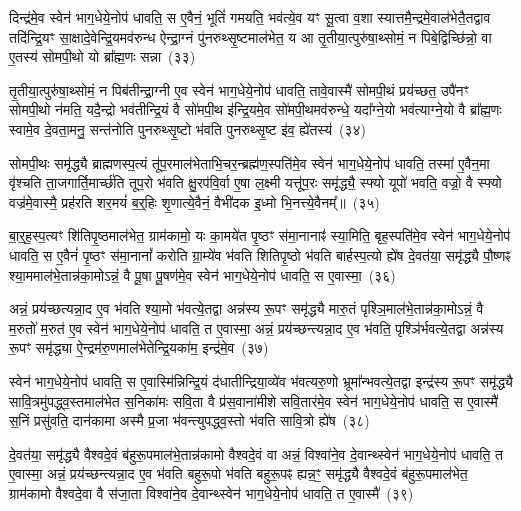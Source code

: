 दिन्द्र॑मे॒व स्वेन॑ भाग॒धेये॒नोप॑ धावति॒ स ए॒वैनं॒ भूतिं॑ गमयति॒ भव॑त्ये॒व यꣳ सू॒त्वा व॒शा स्यात्तमै॒न्द्रमे॒वाल॑भेतै॒तद्वाव तदि॑न्द्रि॒यꣳ सा॒क्षादे॒वेन्द्रि॒यमव॑रुन्ध ऐन्द्रा॒ग्नं पु॑नरुथ्सृ॒ष्टमा\-ल॑भेत॒ य आ तृ॒तीया॒त्पुरु॑षा॒थ्सोमं॒ न पिबे॒द्विच्छि॑न्नो॒ वा ए॒तस्य॑ सोमपी॒थो यो ब्रा᳚ह्म॒णः सन्ना~(३३)\ip

तृ॒तीया॒त्पुरु॑षा॒थ्सोमं॒ न पिब॑तीन्द्रा॒ग्नी ए॒व स्वेन॑ भाग॒धेये॒नोप॑ धावति॒ तावे॒वास्मै॑ सोमपी॒थं प्रय॑च्छत॒ उपै॑नꣳ सोमपी॒थो न॑मति॒ यदै॒न्द्रो भव॑तीन्द्रि॒यं वै सो॑मपी॒थ इ॑न्द्रि॒यमे॒व सो॑मपी॒थमव॑\-रुन्धे॒ यदा᳚ग्ने॒यो भव॑त्याग्ने॒यो वै ब्रा᳚ह्म॒णः स्वामे॒व दे॒वता॒मनु॒ सन्त॑नोति पुनरुथ्सृ॒ष्टो भ॑वति पुनरुथ्सृ॒ष्ट इ॑व॒ ह्ये॑तस्य॑~(३४)\ip

सोमपी॒थः समृ॑द्ध्यै ब्राह्मणस्प॒त्यं तू॑प॒रमाल॑भेताभि॒\-चर॒न्ब्रह्म॑ण॒स्पति॑मे॒व स्वेन॑ भाग॒धेये॒नोप॑ धावति॒ तस्मा॑ ए॒वैन॒मा वृ॑श्चति ता॒जगार्ति॒मार्च्छ॑ति तूप॒रो भ॑वति क्षु॒रप॑वि॒र्वा ए॒षा ल॒क्ष्मी यत्तू॑प॒रः समृ॑द्ध्यै॒ स्फ्यो यूपो॑ भवति॒ वज्रो॒ वै स्फ्यो वज्र॑मे॒वास्मै॒ प्रह॑रति शर॒मयं॑ ब॒र्॒\mbox{}हिः शृ॒णात्ये॒वैनं॒ वैभी॑दक इ॒ध्मो भि॒नत्त्ये॒वैनम्᳚॥~(३५)\ip

{}%

बा॒र्॒\mbox{}ह॒स्प॒त्यꣳ शि॑तिपृ॒ष्ठमा\-ल॑भेत॒ ग्राम॑कामो॒ यः का॒मये॑त पृ॒ष्ठꣳ स॑मा॒नानाꣴ॑ स्या॒मिति॒ बृह॒स्पति॑मे॒व स्वेन॑ भाग॒धेये॒नोप॑ धावति॒ स ए॒वैनं॑ पृ॒ष्ठꣳ स॑मा॒नानां᳚ करोति ग्रा॒म्ये॑व भ॑वति शितिपृ॒ष्ठो भ॑वति बार्\mbox{}हस्प॒त्यो ह्ये॑ष दे॒वत॑या॒ समृ॑द्ध्यै पौ॒ष्णꣴ श्या॒ममाल॑भे॒तान्न॑का॒मो\-ऽन्नं॒ वै पू॒षा पू॒षण॑मे॒व स्वेन॑ भाग॒धेये॒नोप॑ धावति॒ स ए॒वास्मा॒~(३६)\ip

अन्नं॒ प्रय॑च्छत्यन्ना॒द ए॒व भ॑वति श्या॒मो भ॑वत्ये॒तद्वा अन्न॑स्य रू॒पꣳ समृ॑द्ध्यै मारु॒तं पृश्ञि॒माल॑भे॒तान्न॑का॒मो\-ऽन्नं॒ वै म॒रुतो॑ म॒रुत॑ ए॒व स्वेन॑ भाग॒धेये॒नोप॑ धावति॒ त ए॒वास्मा॒ अन्नं॒ प्रय॑च्छन्त्यन्ना॒द ए॒व भ॑वति॒ पृश्ञि॑र्भवत्ये॒तद्वा अन्न॑स्य रू॒पꣳ समृ॑द्ध्या ऐ॒न्द्रम॑रु॒णमाल॑भेतेन्द्रि॒यका॑म॒ इन्द्र॑मे॒व~(३७)\ip

स्वेन॑ भाग॒धेये॒नोप॑ धावति॒ स ए॒वास्मि॑न्निन्द्रि॒यं द॑धातीन्द्रिया॒\-व्ये॑व भ॑वत्यरु॒णो भ्रूमा᳚न्भवत्ये॒तद्वा इन्द्र॑स्य रू॒पꣳ समृ॑द्ध्यै सावि॒त्र\-मु॑प\-द्ध्व॒स्तमाल॑भेत स॒निका॑मः सवि॒ता वै प्र॑स॒वाना॑मीशे सवि॒तार॑मे॒व स्वेन॑ भाग॒धेये॒नोप॑ धावति॒ स ए॒वास्मै॑ स॒निं प्रसु॑वति॒ दान॑कामा अस्मै प्र॒जा भ॑वन्त्युपद्ध्व॒स्तो भ॑वति सावि॒त्रो ह्ये॑ष~(३८)\ip

दे॒वत॑या॒ समृ॑द्ध्यै वैश्वदे॒वं ब॑हुरू॒पमाल॑भे॒तान्न॑कामो वैश्वदे॒वं वा अन्नं॒ विश्वा॑ने॒व दे॒वान्थ्स्वेन॑ भाग॒धेये॒नोप॑ धावति॒ त ए॒वास्मा॒ अन्नं॒ प्रय॑च्छन्त्यन्ना॒द ए॒व भ॑वति बहुरू॒पो भ॑वति बहुरू॒पꣴ ह्यन्न॒ꣳ॒ समृ॑द्ध्यै वैश्वदे॒वं ब॑हुरू॒पमा\-ल॑भेत॒ ग्राम॑कामो वैश्वदे॒वा वै स॑जा॒ता विश्वा॑ने॒व दे॒वान्थ्स्वेन॑ भाग॒धेये॒नोप॑ धावति॒ त ए॒वास्मै॑~(३९)\ip

